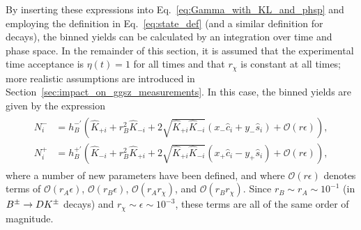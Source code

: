 By inserting these expressions into Eq.~\eqref{eq:Gamma_with_KL_and_phsp} and employing the definition in Eq.~\eqref{eq:state_def} (and a similar definition for \Bp decays), the binned yields can be calculated by an integration over time and phase space. In the remainder of this section, it is assumed that the experimental time acceptance is $\eta(t)=1$ for all times and that $r_\chi$ is constant at all times; more realistic assumptions are introduced in Section~\ref{sec:impact_on_ggsz_measurements}. In this case, the binned yields are given by the expression
\begin{align}
\begin{split}\label{eq:final_yields}
    N^-_i&= h_B^{-'} \left( \hat K_{+i} + r_B^2\hat K_{-i} + 2 \sqrt{\hat K_{+i} \hat K_{-i}}(x_- \hat c_i + y_- \hat s_i)   + \mathcal O(r\epsilon) \right),
    \\
    N^+_i&= h_B^{+'} \left(\hat K_{-i} + r_B^2\hat K_{+i} + 2 \sqrt{\hat K_{+i} \hat K_{-i}}(x_+ \hat c_i - y_+ \hat s_i)   + \mathcal O(r\epsilon) \right),
        \end{split}
\end{align}
where a number of new parameters have been defined, and where $\mathcal O(r\epsilon)$ denotes terms of $\mathcal O(r_{A}\epsilon)$, $\mathcal O(r_{B}\epsilon)$, $ \mathcal O(r_{A}r_\chi)$,  and $ \mathcal O(r_{B}r_\chi)$. Since $r_B \sim r_A \sim 10^{-1}$ (in ${{B}^\pm}\rightarrow{\ensuremath{D}}{\ensuremath{{K}^\pm}}$ decays) and $r_\chi\sim\epsilon \sim 10^{-3}$, these terms are all of the same order of magnitude. 


